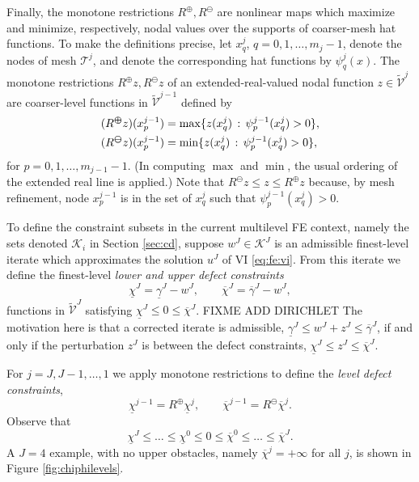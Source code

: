 \documentclass[letterpaper,final,12pt,reqno]{amsart}
\theoremstyle{cstyle}
\theoremstyle{cstyle*}
\theoremstyle{dstyle}
\numberwithin{equation}{section}
\numberwithin{figure}{section}
\numberwithin{table}{section}
\numberwithin{theorem}{section}
\newcommand{\cK}{\mathcal{K}}
\newcommand{\maxR}{R^{\bm{\oplus}}}
\newcommand{\minR}{R^{\bm{\ominus}}}
\begin{document}
Finally, the monotone restrictions $\maxR,\minR$ are nonlinear maps which maximize and minimize, respectively, nodal values over the supports of coarser-mesh hat functions.  To make the definitions precise, let $x_q^j$, $q=0,1,\dots,m_j-1$, denote the nodes of mesh $\mathcal{T}^j$, and denote the corresponding hat functions \cite{Elmanetal2014} by $\psi_q^j(x)$.  The monotone restrictions $\maxR z,\minR z$ of an extended-real-valued nodal function $z\in\tilde{\mathcal{V}}^j$ are coarser-level functions in $\tilde{\mathcal{V}}^{j-1}$ defined by
\begin{align}
(\maxR z)(x_p^{j-1}) &= \max \{z(x_q^j) \,:\, \psi_p^{j-1}(x_q^j) > 0\}, \label{eq:fe:monotonerestrictions} \\
(\minR z)(x_p^{j-1}) &= \min \{z(x_q^j) \,:\, \psi_p^{j-1}(x_q^j) > 0\}, \notag
\end{align}
for $p=0,1,\dots,m_{j-1}-1$.  (In computing $\max$ and $\min$, the usual ordering of the extended real line is applied.)  Note that $\minR z \le z \le \maxR z$ because, by mesh refinement, node $x_p^{j-1}$ is in the set of $x_q^j$ such that $\psi_p^{j-1}(x_q^j)>0$.

To define the constraint subsets in the current multilevel FE context, namely the sets denoted $\cK_i$ in Section \ref{sec:cd}, suppose $w^J \in \cK^J$ is an admissible finest-level iterate which approximates the solution $u^J$ of VI \eqref{eq:fe:vi}.  From this iterate we define the finest-level \emph{lower and upper defect constraints} \cite{GraeserKornhuber2009}
\begin{equation}
\underline{\chi}^J = \underline{\gamma}^J - w^J, \qquad \overline{\chi}^J = \overline{\gamma}^J - w^J, \label{eq:fe:defectconstraints}
\end{equation}
functions in $\tilde{\mathcal{V}}^J$ satisfying $\underline{\chi}^J \le 0 \le \overline{\chi}^J$.  FIXME ADD DIRICHLET The motivation here is that a corrected iterate is admissible, $\underline{\gamma}^J \le w^J + z^J \le \overline{\gamma}^J$, if and only if the perturbation $z^J$ is between the defect constraints, $\underline{\chi}^J \le z^J \le \overline{\chi}^J$.

For $j=J,J-1,\dots,1$ we apply monotone restrictions to define the \emph{level defect constraints},
\begin{equation}
\underline{\chi}^{j-1} = \maxR \underline{\chi}^j, \qquad \overline{\chi}^{j-1} = \minR \overline{\chi}^j. \label{eq:fe:chilevels}
\end{equation}
Observe that
\begin{equation}
\underline{\chi}^{J} \le \dots \le \underline{\chi}^0 \le 0 \le \overline{\chi}^0 \le \dots \le \overline{\chi}^J. \label{eq:fe:chiordering}
\end{equation}
A $J=4$ example, with no upper obstacles, namely $\overline{\chi}^j=+\infty$ for all $j$, is shown in Figure \ref{fig:chiphilevels}.
\end{document}
